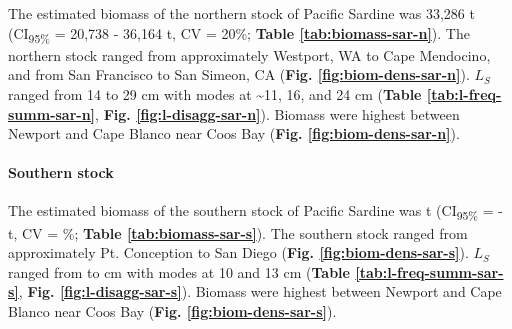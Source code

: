 \documentclass[]{article}
\let\oldparagraph\paragraph
\renewcommand{\paragraph}[1]{\oldparagraph{#1}\mbox{}}
\begin{document}
The estimated biomass of the northern stock of Pacific Sardine was 33,286 t (CI\textsubscript{95\%} = 20,738 - 36,164 t, CV = 20\%; \textbf{Table \ref{tab:biomass-sar-n}}). The northern stock ranged from approximately Westport, WA to Cape Mendocino, and from San Francisco to San Simeon, CA (\textbf{Fig. \ref{fig:biom-dens-sar-n}}). \(L_S\) ranged from 14 to 29 cm with modes at \textasciitilde11, 16, and 24 cm (\textbf{Table \ref{tab:l-freq-summ-sar-n}}, \textbf{Fig. \ref{fig:l-disagg-sar-n}}). Biomass were highest between Newport and Cape Blanco near Coos Bay (\textbf{Fig. \ref{fig:biom-dens-sar-n}}).



\begin{table}[!h]

\caption{\label{tab:biomass-sar-n}Biomass estimates (metric tons, t) and their precision (upper and lower 95\% confidence intervals, CI\textsubscript{95\%}; standard deviation, SD; and coefficient of variation, CV) for the northern stock of Pacific Sardine (\emph{Sardinops sagax}). Stratum areas are nmi\textsuperscript{2}.}
\centering
{}
\end{table}

\hypertarget{results-sardine-southern}{%
\paragraph{Southern stock}\label{results-sardine-southern}}

The estimated biomass of the southern stock of Pacific Sardine was t (CI\textsubscript{95\%} = - t, CV = \%; \textbf{Table \ref{tab:biomass-sar-s}}). The southern stock ranged from approximately Pt. Conception to San Diego (\textbf{Fig. \ref{fig:biom-dens-sar-s}}). \(L_S\) ranged from to cm with modes at 10 and 13 cm (\textbf{Table \ref{tab:l-freq-summ-sar-s}}, \textbf{Fig. \ref{fig:l-disagg-sar-s}}). Biomass were highest between Newport and Cape Blanco near Coos Bay (\textbf{Fig. \ref{fig:biom-dens-sar-s}}).
\end{document}
